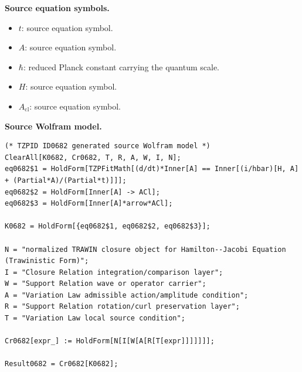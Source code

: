 \begin{minipage}[t]{0.49\linewidth}
\begingroup
\small
\raggedright
\textbf{Source equation symbols.}\par
\begin{itemize}[leftmargin=1.35em,itemsep=1pt,topsep=1pt,parsep=0pt]
    \item $t$: source equation symbol.
    \item $A$: source equation symbol.
    \item $\hbar$: reduced Planck constant carrying the quantum scale.
    \item $H$: source equation symbol.
    \item $A_{\mathrm{cl}}$: source equation symbol.
\end{itemize}
\endgroup
\end{minipage}\hfill
\begin{minipage}[t]{0.47\linewidth}
\begingroup
\scriptsize
\raggedright
\textbf{Source Wolfram model.}\par
\begin{Verbatim}[fontsize=\tiny,breaklines=true,breakanywhere=true]
(* TZPID ID0682 generated source Wolfram model *)
ClearAll[K0682, Cr0682, T, R, A, W, I, N];
eq0682$1 = HoldForm[TZPFitMath[(d/dt)*Inner[A] == Inner[(i/hbar)[H, A] + (Partial*A)/(Partial*t)]]];
eq0682$2 = HoldForm[Inner[A] -> ACl];
eq0682$3 = HoldForm[Inner[A]*arrow*ACl];

K0682 = HoldForm[{eq0682$1, eq0682$2, eq0682$3}];

N = "normalized TRAWIN closure object for Hamilton--Jacobi Equation (Trawinistic Form)";
I = "Closure Relation integration/comparison layer";
W = "Support Relation wave or operator carrier";
A = "Variation Law admissible action/amplitude condition";
R = "Support Relation rotation/curl preservation layer";
T = "Variation Law local source condition";

Cr0682[expr_] := HoldForm[N[I[W[A[R[T[expr]]]]]]];

Result0682 = Cr0682[K0682];
\end{Verbatim}
\endgroup
\end{minipage}

